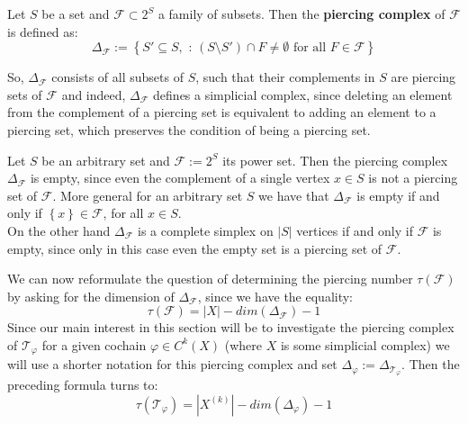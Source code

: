 \begin{defi}
Let \(S\) be a set and \(\mathcal{F}\subset 2^S\) a family of subsets. Then the \textbf{piercing complex} of \(\mathcal{F}\) is defined as:
\[
\Delta_{\mathcal{F}}:=\left\{S'\subseteq S,\text{ : }(S\setminus S')\cap F\neq\emptyset\text{ for all }F\in\mathcal{F}\right\}
\]
\end{defi}
So, \(\Delta_{\mathcal{F}}\) consists of all subsets of \(S\), such that their complements in \(S\) are piercing sets of \(\mathcal{F}\) and indeed, \(\Delta_{\mathcal{F}}\) defines a simplicial complex, since deleting an element from the complement of a piercing set is equivalent to adding an element to a piercing set, which preserves the condition of being a piercing set.\\

\begin{expl}
Let \(S\) be an arbitrary set and \(\mathcal{F}:=2^S\) its power set. Then the piercing complex \(\Delta_{\mathcal{F}}\) is empty, since even the complement of a single vertex \(x\in S\) is not a piercing set of \(\mathcal{F}\). More general for an arbitrary set \(S\) we have that \(\Delta_{\mathcal{F}}\) is empty if and only if \(\left\{x\right\}\in\mathcal{F}\), for all \(x\in S\).\\
On the other hand \(\Delta_{\mathcal{F}}\) is a complete simplex on \(\left|S\right|\) vertices if and only if \(\mathcal{F}\) is empty, since only in this case even the empty set is a piercing set of \(\mathcal{F}\).
\end{expl}

We can now reformulate the question of determining the piercing number \(\tau(\mathcal{F})\) by asking for the dimension of \(\Delta_{\mathcal{F}}\), since we have the equality:
\[
\tau(\mathcal{F})=\left| X\right|-dim(\Delta_{\mathcal{F}})-1
\]
Since our main interest in this section will be to investigate the piercing complex of \(\mathcal{T}_{\varphi}\) for a given cochain \(\varphi\in C^k(X)\) (where \(X\) is some simplicial complex) we will use a shorter notation for this piercing complex and set \(\Delta_{\varphi}:=\Delta_{\mathcal{T}_{\varphi}}\). Then the preceding formula turns to:
\[
\tau(\mathcal{T}_{\varphi})=|X^{(k)}|-dim(\Delta_{\varphi})-1
\]


